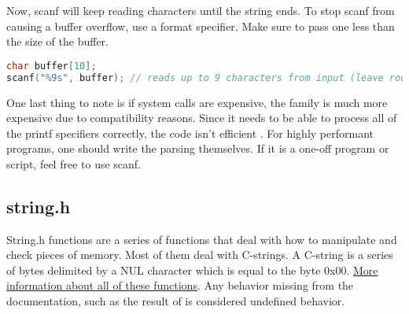 Now, scanf will keep reading characters until the string ends.
To stop scanf from causing a buffer overflow, use a format specifier.
Make sure to pass one less than the size of the buffer.

\begin{lstlisting}[language=C]
char buffer[10];
scanf("%9s", buffer); // reads up to 9 characters from input (leave room for the 10th byte to be the terminating byte)
\end{lstlisting}

One last thing to note is if system calls are expensive, the  family is much more expensive due to compatibility reasons.
Since it needs to be able to process all of the printf specifiers correctly, the code isn't efficient .
For highly performant programs, one should write the parsing themselves.
If it is a one-off program or script, feel free to use scanf.

\subsection{string.h}

String.h functions are a series of functions that deal with how to manipulate and check pieces of memory.
Most of them deal with C-strings.
A C-string is a series of bytes delimited by a NUL character which is equal to the byte 0x00.
\href{https://linux.die.net/man/3/string}{More information about all of these functions}.
Any behavior missing from the documentation, such as the result of  is considered undefined behavior.

